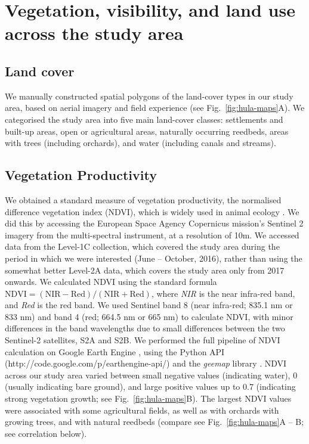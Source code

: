 \section*{Vegetation, visibility, and land use across the study area}

\subsection*{Land cover}

We manually constructed spatial polygons of the land-cover types in our study area, based on aerial imagery and field experience (see Fig.~\ref{fig:hula-maps}A).
We categorised the study area into five main land-cover classes: settlements and built-up areas, open or agricultural areas, naturally occurring reedbeds, areas with trees (including orchards), and water (including canals and streams). 

\subsection*{Vegetation Productivity}

We obtained a standard measure of vegetation productivity, the normalised difference vegetation index (NDVI), which is widely used in animal ecology \cite{pettorelli2011}.
We did this by accessing the European Space Agency Copernicus mission's Sentinel 2 imagery from the multi-spectral instrument, at a resolution of 10m.
We accessed data from the Level-1C collection, which covered the study area during the period in which we were interested (June -- October, 2016), rather than using the somewhat better Level-2A data, which covers the study area only from 2017 onwards.
We calculated NDVI using the standard formula $\text{NDVI} = (\text{NIR} - \text{Red}) / (\text{NIR} + \text{Red})$, where \textit{NIR} is the near infra-red band, and \textit{Red} is the red band.
We used Sentinel band 8 (near infra-red; 835.1 nm or 833 nm) and band 4 (red; 664.5 nm or 665 nm) to
calculate NDVI, with minor differences in the band wavelengths due to small differences between the two Sentinel-2 satellites, S2A and S2B.
We performed the full pipeline of NDVI calculation on Google Earth Engine \cite{gorelick2017}, using the Python API (http://code.google.com/p/earthengine-api/) and the \textit{geemap} library \cite{wu2020}.
NDVI across our study area varied between small negative values (indicating water), 0 (usually indicating bare ground), and large positive values up to 0.7 (indicating strong vegetation growth; see Fig.~\ref{fig:hula-maps}B).
The largest NDVI values were associated with some agricultural fields, as well as with orchards with growing trees, and with natural reedbeds (compare see Fig.~\ref{fig:hula-maps}A -- B; see correlation below).

